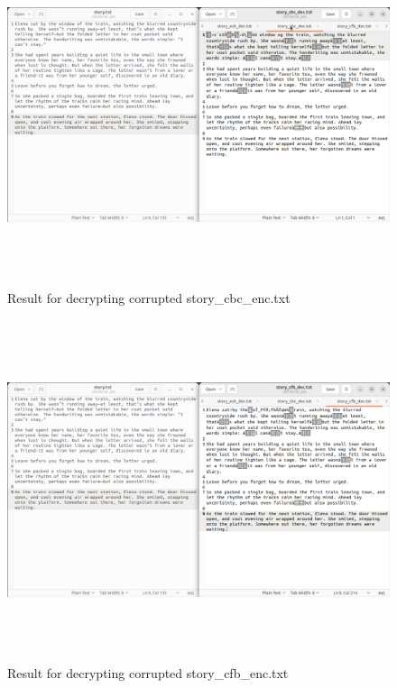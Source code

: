 \documentclass{article}
\begin{document}
\begin{figure}[h]
    \centering
    \includegraphics[height=10cm]{images/text_comp_cbc.png}
    \caption{Result for decrypting corrupted story\_cbc\_enc.txt}
\end{figure}
\begin{figure}[h]
    \centering
    \includegraphics[height=10cm]{images/text_comp_cfb.png}
    \caption{Result for decrypting corrupted story\_cfb\_enc.txt}
\end{figure}
\end{document}
